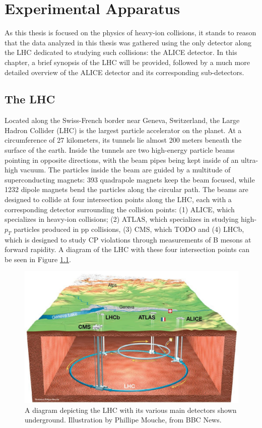 \chapter{Experimental Apparatus}
As this thesis is focused on the physics of heavy-ion collisions, it stands to reason that the data analyzed in this thesis was gathered using the only detector along the LHC dedicated to studying such collisions: the ALICE detector.
In this chapter, a brief synopsis of the LHC will be provided, followed by a much more detailed overview of the ALICE detector and its corresponding sub-detectors. 

\section{The LHC}
Located along the Swiss-French border near Geneva, Switzerland, the Large Hadron Collider (LHC) is the largest particle accelerator on the planet.
At a circumference of 27 kilometers, its tunnels lie almost 200 meters beneath the surface of the earth.
Inside the tunnels are two high-energy particle beams pointing in opposite directions, with the beam pipes being kept inside of an ultra-high vacuum.
The particles inside the beam are guided by a multitude of superconducting magnets: 393 quadrapole magnets keep the beam focused, while 1232 dipole magnets bend the particles along the circular path. 
The beams are designed to collide at four intersection points along the LHC, each with a corresponding detector surrounding the collision points: (1) ALICE, which specializes in heavy-ion collisions; (2) ATLAS, which specializes in studying high-$p_{T}$ particles produced in pp collisions, (3) CMS, which TODO and (4) LHCb, which is designed to study CP violations through measurements of B mesons at forward rapidity. 
A diagram of the LHC with these four intersection points can be seen in Figure \ref{fig:lhcring}.
\begin{figure}
    \centering
    \includegraphics[scale=0.5]{figures/experiment/lhcring_illustration.jpeg}
    \caption{A diagram depicting the LHC with its various main detectors shown underground. Illustration by Phillipe Mouche, from BBC News.}
    \label{fig:lhcring}
\end{figure}


